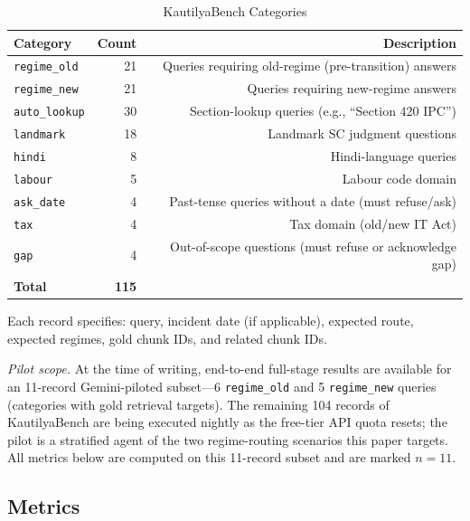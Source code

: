 \documentclass[conference]{IEEEtran}
\begin{document}
\begin{table}[h]
\centering
\caption{KautilyaBench Categories}
\label{tab:bench}
\begin{tabular}{@{}lrr@{}}
\toprule
\textbf{Category} & \textbf{Count} & \textbf{Description} \\
\midrule
\texttt{regime\_old} & 21 & Queries requiring old-regime (pre-transition) answers \\
\texttt{regime\_new} & 21 & Queries requiring new-regime answers \\
\texttt{auto\_lookup} & 30 & Section-lookup queries (e.g., ``Section 420 IPC'') \\
\texttt{landmark} & 18 & Landmark SC judgment questions \\
\texttt{hindi} & 8 & Hindi-language queries \\
\texttt{labour} & 5 & Labour code domain \\
\texttt{ask\_date} & 4 & Past-tense queries without a date (must refuse/ask) \\
\texttt{tax} & 4 & Tax domain (old/new IT Act) \\
\texttt{gap} & 4 & Out-of-scope questions (must refuse or acknowledge gap) \\
\bottomrule
\textbf{Total} & \textbf{115} & \\
\end{tabular}
\end{table}

Each record specifies: query, incident date (if applicable), expected route, expected regimes, gold chunk IDs, and related chunk IDs.

\emph{Pilot scope.} At the time of writing, end-to-end full-stage results are
available for an 11-record Gemini-piloted subset---6 \texttt{regime\_old} and 5
\texttt{regime\_new} queries (categories with gold retrieval targets). The
remaining 104 records of KautilyaBench are being executed nightly as the
free-tier API quota resets; the pilot is a stratified agent of the two
regime-routing scenarios this paper targets. All metrics below are computed on
this 11-record subset and are marked $n=11$.

\subsection{Metrics}
\end{document}

